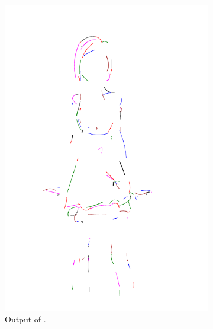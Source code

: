 \begin{figure}[h]
\begin{subfigure}{.3\textwidth}
    \includegraphics[width=\textwidth]{graphics/outputs/deepvectechdraw/order/sketchbench-black_Art_freeform_AG_03_Branislav Mirkovic_norm_cleaned.pdf}
    \caption{Output of \citet{DBLP:conf/eccv/EgiazarianVAVST20}.}
    \end{subfigure}
    \begin{subfigure}{.3\textwidth}

\end{subfigure}
\end{figure}
